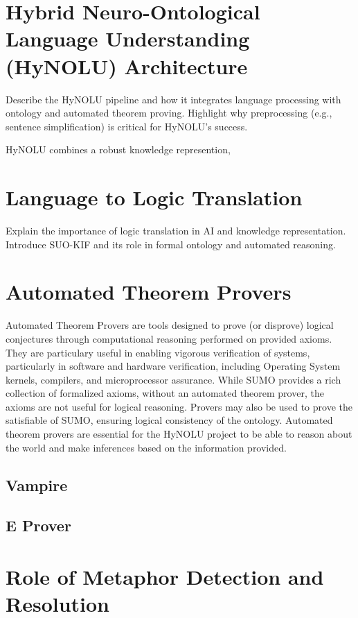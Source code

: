 \section{Hybrid Neuro-Ontological Language Understanding (HyNOLU) Architecture}
Describe the HyNOLU pipeline and how it integrates language processing with ontology and automated theorem proving. Highlight why preprocessing (e.g., sentence simplification) is critical for HyNOLU's success.

HyNOLU combines a robust knowledge represention, 

\section{Language to Logic Translation}
Explain the importance of logic translation in AI and knowledge representation. Introduce SUO-KIF and its role in formal ontology and automated reasoning.


\section{Automated Theorem Provers}
Automated Theorem Provers are tools designed to prove (or disprove) logical conjectures through computational reasoning performed on provided axioms. They are particulary useful in enabling vigorous verification of systems, particularly in software and hardware verification, including Operating System kernels, compilers, and microprocessor assurance. While SUMO provides a rich collection of formalized axioms, without an automated theorem prover, the axioms are not useful for logical reasoning. Provers may also be used to prove the satisfiable of SUMO, ensuring logical consistency of the ontology. Automated theorem provers are essential for the HyNOLU project to be able to reason about the world and make inferences based on the information provided.

\subsection{Vampire}

\subsection{E Prover}



\section{Role of Metaphor Detection and Resolution}

